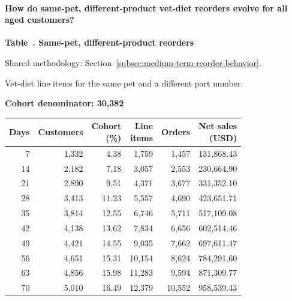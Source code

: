 \paragraph{How do same-pet, different-product vet-diet reorders evolve for all aged customers?}

\label{tab:financial-opportunity-reorder-same-pet-different-part}
\par\smallskip\noindent\parbox[t][2\baselineskip][t]{\linewidth}{\raggedright\textbf{Table~\thetable. Same-pet, different-product reorders}}
\par\raggedright\footnotesize Shared methodology: Section~\ref{subsec:medium-term-reorder-behavior}.
\par\noindent\parbox[t][2\baselineskip][t]{\linewidth}{\raggedright Vet-diet line items for the same pet and a different part number.}
\par\noindent\textbf{Cohort denominator: 30,382}
\par\centering\footnotesize
\setlength{\tabcolsep}{2pt}
\begin{tabular}{rrrrrr}\toprule
Days & Customers & \shortstack{Cohort\\(\%)} & \shortstack{Line\\items} & Orders & \shortstack{Net sales\\(USD)} \\ \midrule

7 & 1,332 & 4.38 & 1,759 & 1,457 & 131,868.43 \\

14 & 2,182 & 7.18 & 3,057 & 2,553 & 230,664.90 \\

21 & 2,890 & 9.51 & 4,371 & 3,677 & 331,352.10 \\

28 & 3,413 & 11.23 & 5,557 & 4,690 & 423,651.71 \\

35 & 3,814 & 12.55 & 6,746 & 5,711 & 517,109.08 \\

42 & 4,138 & 13.62 & 7,834 & 6,656 & 602,514.46 \\

49 & 4,421 & 14.55 & 9,035 & 7,662 & 697,611.47 \\

56 & 4,651 & 15.31 & 10,154 & 8,624 & 784,291.60 \\

63 & 4,856 & 15.98 & 11,283 & 9,594 & 871,309.77 \\

70 & 5,010 & 16.49 & 12,379 & 10,552 & 958,539.43 \\
\bottomrule\end{tabular}\par


